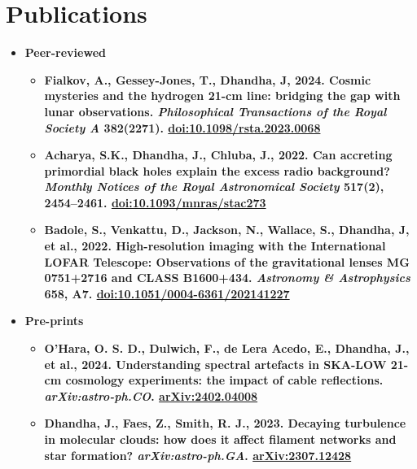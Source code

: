 \documentclass[letterpaper,11pt]{article}
\newcommand{\resumeItem}[2]{
  \item\small{
    \textbf{#1}{ #2 \vspace{-2pt}}
  }
}
\newcommand{\resumeItemListStart}{\begin{itemize}}
\newcommand{\resumeItemListEnd}{\end{itemize}\vspace{-5pt}}
\begin{document}
\section{Publications}
\begin{itemize}[leftmargin=*]
\item \textbf{Peer-reviewed} \vspace{-5pt}
\resumeItemListStart
\resumeItem
{\normalfont Fialkov, A., Gessey-Jones, T., \textbf{Dhandha, J}, 2024. Cosmic mysteries and the hydrogen 21-cm line: bridging the gap with lunar observations. \textit{Philosophical Transactions of the Royal Society A} \textbf{382}(2271). \href{https://doi.org/10.1098/rsta.2023.0068}{doi:10.1098/rsta.2023.0068}}{}
\resumeItem
{\normalfont Acharya, S.K., \textbf{Dhandha, J.}, Chluba, J., 2022. Can accreting primordial black holes explain the excess radio background? \textit{Monthly Notices of the Royal Astronomical Society} \textbf{517}(2), 2454–2461. \href{https://doi.org/10.1093/mnras/stac2739}{doi:10.1093/mnras/stac273}}{}
\resumeItem
{\normalfont Badole, S., Venkattu, D., Jackson, N., Wallace, S., \textbf{Dhandha, J}, et al., 2022. High-resolution imaging with the International LOFAR Telescope: Observations of the gravitational lenses MG 0751+2716 and CLASS B1600+434. \textit{Astronomy \& Astrophysics} \textbf{658}, A7. \href{https://doi.org/10.1051/0004-6361/202141227}{doi:10.1051/0004-6361/202141227}}{}
\resumeItemListEnd
\end{itemize}


\begin{itemize}[leftmargin=*]
\item \textbf{Pre-prints} \vspace{-5pt}
\resumeItemListStart
\resumeItem
{\normalfont O'Hara, O. S. D., Dulwich, F., de Lera Acedo, E., \textbf{Dhandha, J.}, et al., 2024.  Understanding spectral artefacts in SKA-LOW 21-cm cosmology experiments: the impact of cable reflections. \textit{arXiv:astro-ph.CO}. \href{https://arxiv.org/abs/2402.04008}{arXiv:2402.04008}}{}
\resumeItem
{\normalfont \textbf{Dhandha, J.}, Faes, Z., Smith, R. J., 2023.  Decaying turbulence in molecular clouds: how does it affect filament networks and star formation? \textit{arXiv:astro-ph.GA}. \href{https://arxiv.org/abs/2307.12428}{arXiv:2307.12428}}{}
\resumeItemListEnd
\end{itemize}

\end{document}
